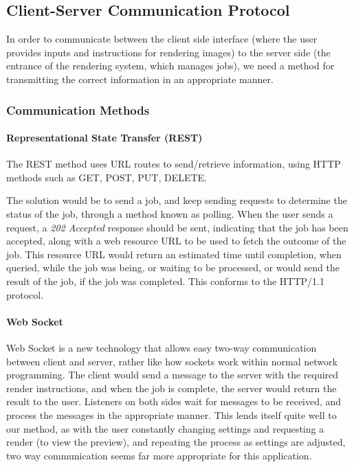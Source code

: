 \documentclass[10pt,a4paper]{article}
\begin{document}
\subsection{Client-Server Communication Protocol}
In order to communicate between the client side interface (where the user provides inputs and instructions
for rendering images) to the server side (the entrance of the rendering system, which manages jobs), we need
a method for transmitting the correct information in an appropriate manner.

\subsubsection{Communication Methods}
\paragraph{Representational State Transfer (REST)}
The REST method uses URL routes to send/retrieve information, using HTTP methods such as
GET, POST, PUT, DELETE.

The solution would be to send a job, and keep sending requests to determine the status of the job, through a
method known as polling. When the user sends a request, a \emph{202 Accepted} response should be sent,
indicating that the job has been accepted, along with a web resource URL to be used to fetch the outcome of
the job. This resource URL would return an estimated time until completion, when queried, while the job was being, or waiting to be processed,
or would send the result of the job, if the job was completed. This conforms to the HTTP/1.1 protocol. \cite{RESTandLongRunningJobs}


\paragraph{Web Socket}
Web Socket is a new technology that allows easy two-way communication between client and server, rather like how
sockets work within normal network programming. The client would send a message to the server with the required
render instructions, and when the job is complete, the server would return the result to the user. Listeners on both
sides wait for messages to be received, and process the messages in the appropriate manner.
\cite{WebsocketSpec}
This lends itself quite well to our method, as with the user constantly changing settings and requesting a render (to
view the preview), and repeating the process as settings are adjusted, two way communication seems far more appropriate
for this application.
\end{document}
